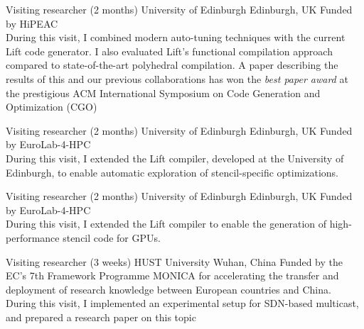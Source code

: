 \documentclass[11pt,a4paper,sans]{moderncv}        %
\begin{document}
					{Visiting researcher (2 months)}
					{University of Edinburgh}
					{Edinburgh, UK}{}
					{Funded by HiPEAC\\
                     During this visit, I combined modern auto-tuning techniques with the current Lift code generator.
                     I also evaluated Lift's functional compilation approach compared to state-of-the-art polyhedral compilation.
                     A paper describing the results of this and our previous collaborations has won the \textit{best paper award} at the prestigious ACM International Symposium on Code Generation and Optimization (CGO)~\cite{cgo2018}
					}

					{Visiting researcher (2 months)}
					{University of Edinburgh}
					{Edinburgh, UK}{}
					{Funded by EuroLab-4-HPC\\
					 During this visit, I extended the Lift compiler, developed at the
					 University of Edinburgh, to enable automatic exploration of stencil-specific optimizations.
					}

					{Visiting researcher (2 months)}
					{University of Edinburgh}
					{Edinburgh, UK}{}
					{Funded by EuroLab-4-HPC\\
					 During this visit, I extended the Lift compiler to enable the generation of
					 high-performance stencil code for GPUs.
					}

					{Visiting researcher (3 weeks)}
					{HUST University}
					{Wuhan, China}{}
					{Funded by the EC’s 7th Framework Programme MONICA for accelerating the transfer
					 and deployment of research knowledge between European countries and China.
					 During this visit, I implemented an experimental setup for SDN-based multicast,
					 and prepared a research paper on this topic~\cite{humernbrum}
					}

\printbibheading[title={Publications}]
\printbibliography[heading=none]
%
%
\end{document}
